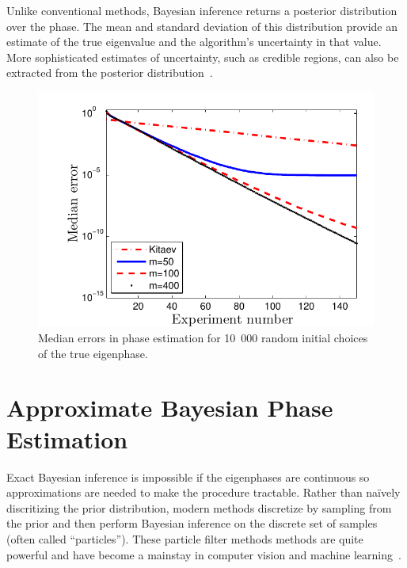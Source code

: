 \documentclass[aps,pra,amsmath,twocolumn,amssymb,superscriptaddress]{revtex4-1}
\begin{document}
Unlike conventional methods, Bayesian inference returns a posterior
distribution over the phase. The mean and standard deviation of this
distribution provide an estimate of the true eigenvalue and the algorithm's
uncertainty in that value. More sophisticated estimates of uncertainty, such
as credible regions, can also be extracted from the posterior
distribution~\cite{granade_robust_2012,ferrie_high_2014}.  


\begin{figure}[t!]
    \begin{centering}
        \includegraphics[width=0.8\linewidth]{PEerror.pdf}
    \end{centering}
    \caption{\label{fig:PEerror}
     Median errors in phase estimation for 10~000 random initial choices of the true eigenphase.
    }
\end{figure}





\section{Approximate Bayesian Phase Estimation}

Exact Bayesian inference is impossible if the eigenphases are
continuous so approximations are needed to
make the procedure tractable.  Rather than na\"ively discritizing the prior
distribution, modern methods discretize by sampling from the prior and
then perform Bayesian inference on the discrete set of samples (often called
``particles'').  These particle filter methods methods are quite powerful and
have become a mainstay in computer vision and machine
learning~\cite{haykin2004kalman,smith2013sequential,isard_condensationconditional_1998}.
\end{document}
